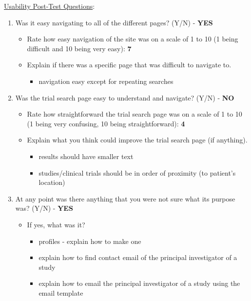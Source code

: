 \documentclass[12pt]{article}
\begin{document}
\noindent \underline{Usability Post-Test Questions}:
\begin{enumerate}
    \item Was it easy navigating to all of the different pages? (Y/N) - \textbf{YES}
      \begin{itemize}
        \item Rate how easy navigation of the site was on a scale of 1 to 10 (1 being difficult and 10 being very easy): \textbf{7}
        \item Explain if there was a specific page that was difficult to navigate to.
        \begin{itemize}
          \item navigation easy except for repeating searches
        \end{itemize}
      \end{itemize}
      \item Was the trial search page easy to understand and navigate? (Y/N) - \textbf{NO}
      \begin{itemize}
        \item Rate how straightforward the trial search page was on a scale of 1 to 10 (1 being very confusing, 10 being straightforward): \textbf{4}
        \item Explain what you think could improve the trial search page (if anything).
        \begin{itemize}
          \item results should have smaller text
          \item studies/clinical trials should be in order of proximity (to patient's location)
        \end{itemize}
      \end{itemize}
    \item At any point was there anything that you were not sure what its purpose was? (Y/N) - \textbf{YES}
      \begin{itemize}
        \item If yes, what was it?
        \begin{itemize}
          \item profiles - explain how to make one
          \item explain how to find contact email of the principal investigator of a study
          \item explain how to email the principal investigator of a study using the email template
        \end{itemize}
      \end{itemize}

\end{enumerate}
\end{document}
